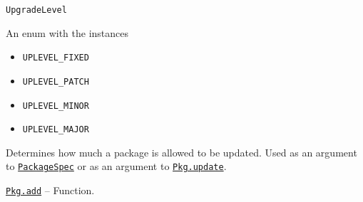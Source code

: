\begin{adjustwidth}{2em}{0pt}


\begin{verbatim}
UpgradeLevel
\end{verbatim}

An enum with the instances

\begin{itemize}
\item \texttt{UPLEVEL\_FIXED}


\item \texttt{UPLEVEL\_PATCH}


\item \texttt{UPLEVEL\_MINOR}


\item \texttt{UPLEVEL\_MAJOR}

\end{itemize}
Determines how much a package is allowed to be updated. Used as an argument to  \hyperlink{7769325907319883786}{\texttt{PackageSpec}} or as an argument to \hyperlink{10543171283952432470}{\texttt{Pkg.update}}.



\end{adjustwidth}
\hypertarget{8338790878119011265}{} 
\hyperlink{8338790878119011265}{\texttt{Pkg.add}}  -- {Function.}

